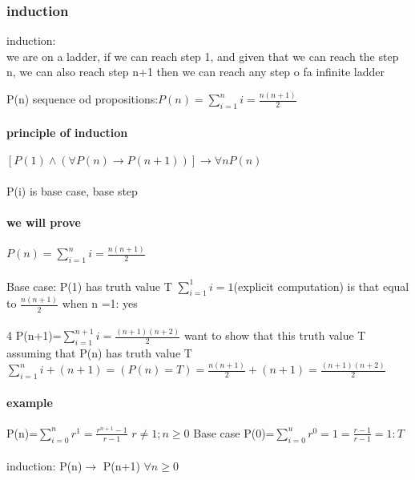 \documentclass[a4paper,10pt]{article}
\begin{document}
{\subsubsection{induction}
\begin{description}
 \item induction:\\{we are on a ladder, if we can reach step 1, and given that we can reach the step n, we can also reach step n+1 then we can reach any step o fa infinite ladder}
\end{description}
P(n) sequence od propositions:$P(n)=\sum_{i=1}^ni=\frac{n(n+1)}{2}$
\paragraph{principle of induction}
$[P(1)\wedge(\forall P(n)\rightarrow P(n+1))]\rightarrow\forall nP(n)$
\paragraph{}
P(i) is base case, base step
\paragraph{we will prove}
$P(n)=\sum_{i=1}^ni=\frac{n(n+1)}{2}$
\paragraph{}
Base case:
\newline
P(1) has truth value T
\newline
$\sum_{i=1}^1i=1$(explicit computation) is that equal to $\frac{n(n+1)}{2}$ when n =1: yes
\paragraph{}4
P(n+1)=$\sum_{i=1}^{n+1}i=\frac{(n+1)(n+2)}{2}$ want to show that this truth value T assuming that P(n) has truth value T
\newline
$\sum_{i=1}^ni+(n+1)=(P(n)=T)=\frac{n(n+1)}{2}+(n+1)=\frac{(n+1)(n+2)}{2}$
\paragraph{example}
P(n)=$\sum_{i=0}^nr^1=\frac{r^{n+1}-1}{r-1}$ $r\neq 1; n\geq 0$
\newline
Base case
\newline
P(0)=$\sum_{i=0}^ur^0=1=\frac{r-1}{r-1}=1:T$
\paragraph{}
induction: P(n)$\rightarrow$ P(n+1) $\forall n\geq 0$
}
\end{document}
